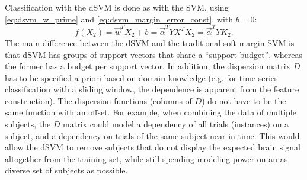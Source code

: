 \begin{sloppypar}
Classification with the \ac{dSVM} is done as with the \ac{SVM}, using
\eqref{eq:dsvm_w_prime} and \eqref{eq:dsvm_margin_error_const}, with $b=0$:
%
\begin{equation}
  f(X_2) = \vec{w}^T X_2 + b = \vec{\alpha}^T Y X^T X_2 = \vec{\alpha}^T Y K_2.
\end{equation}
%
The main difference between the \ac{dSVM} and the traditional soft-margin
\ac{SVM} is that \ac{dSVM} has groups of support vectors that share a ``support
budget'', whereas the former has a budget per support vector. In addition, the
dispersion matrix $D$ has to be specified a priori based on domain knowledge
(e.g. for time series classification with a sliding window, the dependence is
apparent from the feature construction).
%
The dispersion functions (columns of $D$) do not have to be the same function
with an offset. For example, when combining the data of multiple subjects, the
$D$ matrix could model a dependency of all trials (instances) on a subject, and
a dependency on trials of the same subject near in time. This would allow the
\ac{dSVM} to remove subjects that do not display the expected brain signal
altogether from the training set, while still spending modeling power on an as 
diverse set of subjects as possible.
\end{sloppypar}
